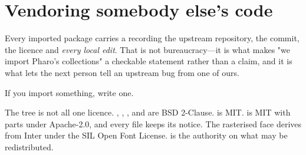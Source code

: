 \section{Vendoring somebody else's code}

Every imported package carries a  recording the upstream
repository, the commit, the licence and \emph{every local edit}. That is not
bureaucracy---it is what makes "we import Pharo's collections" a checkable
statement rather than a claim, and it is what lets the next person tell an
upstream bug from one of ours.

If you import something, write one.

\begin{stnote}[Licensing]
The tree is not all one licence. , , ,
 and  are BSD 2-Clause.  is MIT.
 is MIT with parts under Apache-2.0, and every file keeps its
notice. The rasterised face derives from Inter under the SIL Open Font
License.  is the authority on what may be redistributed.
\end{stnote}
